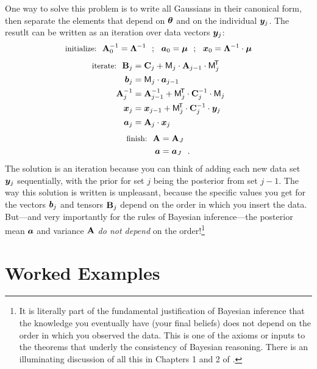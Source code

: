 One way to solve this problem is to write all Gaussians in their canonical form, then separate the elements that depend on $\boldsymbol{\theta}$ and on the individual $\boldsymbol{y}_j$.
The resutlt can be written as an iteration over data vectors $\boldsymbol{y}_j$:
\begin{equation}
  \mbox{\small initialize:}~~
  \mathbf{A}_0^{-1} = \mathbf{\Lambda}^{-1} ~~;~~ \boldsymbol{a}_0 = \boldsymbol{\mu} ~~;~~ \boldsymbol{x}_0 = \mathbf{\Lambda}^{-1}\cdot\boldsymbol{\mu}
\end{equation}
\begin{align}
  \mbox{\small iterate:}~~
  \mathbf{B}_j &= \mathbf{C}_j + \mathsf{M}_j \cdot \mathbf{A}_{j-1} \cdot \mathsf{M}_j^{\!\mathsf{T}\!} \\
  \boldsymbol{b}_j &= \mathsf{M}_j \cdot \boldsymbol{a}_{j-1} \\
  \mathbf{A}_j^{-1} &= \mathbf{A}_{j-1}^{-1} + \mathsf{M}_j^{\!\mathsf{T}\!} \cdot \mathbf{C}_j^{-1} \cdot \mathsf{M}_j \\
  \boldsymbol{x}_j &= \boldsymbol{x}_{j-1} + \mathsf{M}_j^{\!\mathsf{T}\!} \cdot \mathbf{C}_j^{-1} \cdot \boldsymbol{y}_j \\
  \boldsymbol{a}_j &= \mathbf{A}_j \cdot \boldsymbol{x}_j
\end{align}
\begin{align}
  \mbox{\small finish:}~~
  \mathbf{A} &= \mathbf{A}_J \\
  \boldsymbol{a} &= \boldsymbol{a}_J
  ~~.
\end{align}
The solution is an iteration because you can think of adding each new data
set $\boldsymbol{y}_j$ sequentially, with the prior for set $j$ being the posterior from
set $j-1$.
The way this solution is written is unpleasant, because the specific values you get for the
vectors $\boldsymbol{b}_j$ and tensors $\mathbf{B}_j$ depend on the order in which you insert the data.
But---and very importantly for the rules of Bayesian inference---the posterior
mean $\boldsymbol{a}$ and variance $\mathbf{A}$ \emph{do not depend} on the order!\footnote{It
  is literally part of the fundamental justification of Bayesian inference
  that the knowledge you eventually have (your final beliefs) does not depend
  on the order in which you observed the data. This is one of the axioms or inputs
  to the theorems that underly the consistency of Bayesian reasoning.
  There is an illuminating discussion of all this in Chapters 1 and 2 of \cite{jaynes}.}


\section{Worked Examples}\label{sec:examples}

